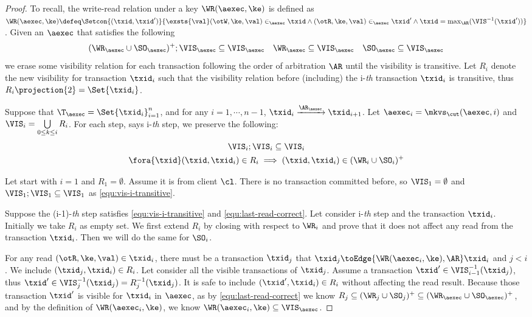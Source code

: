\begin{proof}
    To recall, the write-read relation under a key \( \WR(\aexec, \ke) \) is defined as 
    \( \WR(\aexec, \ke) \defeq \Setcon{ (\txid, \txid') }{ \exsts{\val} (\otW, \ke, \val) \in_\aexec \txid \land (\otR, \ke, \val) \in_\aexec \txid' \land \txid = \max_\AR(\VIS^{-1}(\txid')) }\).
    Given an \( \aexec \) that satisfies the following
    \[
        (\WR_\aexec \cup \SO_\aexec )^{+} ; \VIS_\aexec \subseteq \VIS_\aexec \quad \WR_\aexec \subseteq \VIS_\aexec \quad \SO_\aexec \subseteq \VIS_\aexec
    \]
    we erase some visibility relation for each transaction following the order of arbitration \( \AR \) until the visibility is transitive.
    Let \( R_i \) denote the new visibility for transaction \( \txid_i \) such that
    the visibility relation before (including) the i-\emph{th} transaction \( \txid_i \) is transitive, 
    thus \( R_i\projection{2} = \Set{\txid_i}\).

    Suppose that $\T_{\aexec} = \Set{\txid_{i}}_{i=1}^{n}$, and for any $i=1,\cdots, n-1$,
    $\txid_{i} \xrightarrow{\AR_{\aexec}} \txid_{i+1}$.
    Let \( \aexec_i = \mkvs_\cut(\aexec, i) \) and \( \VIS_i = \bigcup\limits_{ 0 \leq k \leq i} R_i \).
    For each step, says i-\emph{th} step, we  preserve the following:
    \begin{gather}
        \VIS_i ; \VIS_i \subseteq \VIS_i \label{equ:vis-i-transitive} \\
        \fora{\txid} (\txid,\txid_i) \in R_i \implies (\txid, \txid_i) \in (\WR_i \cup \SO_i)^{+}
        \label{equ:last-read-correct}
    \end{gather}
    
    Let start with \( i = 1 \) and \( R_1 = \emptyset \).
    Assume it is from client \( \cl \).
    There is no transaction committed before, so \( \VIS_1 = \emptyset \) and \( \VIS_1 ; \VIS_1 \subseteq \VIS_1 \) as \cref{equ:vis-i-transitive}.

    Suppose the (i-1)-\emph{th} step satisfies \cref{equ:vis-i-transitive} and \cref{equ:last-read-correct}.
    Let consider i-\emph{th} step and the transaction \( \txid_i \).
    Initially we take \( R_i \) as empty set.
    We first extend \( R_i \) by closing with respect to \( \WR_i \)
    and prove that it does not affect any read from the transaction \( \txid_i \).
    Then we will do the same for \( \SO_i \).

    For any read \( (\otR, \ke, \val ) \in \txid_i \),
    there must be a transaction \( \txid_j \) that \( \txid_j \toEdge{\WR(\aexec_i,\ke), \AR} \txid_i \) and \( j < i \).
    We include \( (\txid_j, \txid_i) \in R_i \).
    Let consider all the visible transactions of \( \txid_j \).
    Assume a transaction \( \txid' \in \VIS_{i-1}^{-1}(\txid_j) \), 
    thus \( \txid' \in \VIS_{j}^{-1}(\txid_j) = R_j^{-1}(\txid_j) \).
    It is safe to include \( (\txid', \txid_i) \in R_i \) without affecting the read result.
    Because those transaction \( \txid' \) is visible for \( \txid_i \)  in \( \aexec \),
    as by \cref{equ:last-read-correct} we know \( R_j \subseteq (\WR_j \cup \SO_j)^{+} \subseteq (\WR_\aexec \cup \SO_\aexec)^{+}\),
    and by the definition of \( \WR(\aexec_i,\ke) \), we know \( \WR(\aexec_i,\ke) \subseteq \VIS_\aexec\).


\end{proof}
